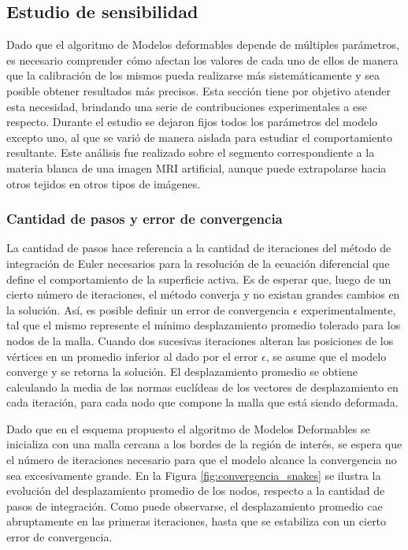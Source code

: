 \subsection{Estudio de sensibilidad}\label{section:estudio_de_sensibilidad}
Dado que el algoritmo de Modelos deformables depende de múltiples parámetros, es necesario comprender cómo afectan los valores de cada uno de ellos de manera que la calibración de los mismos pueda realizarse más sistemáticamente y sea posible obtener resultados más precisos. Esta sección tiene por objetivo atender esta necesidad, brindando una serie de contribuciones experimentales a ese respecto. Durante el estudio se dejaron fijos todos los parámetros del modelo excepto uno, al que se varió de manera aislada para estudiar el comportamiento resultante. Este análisis fue realizado sobre el segmento correspondiente a la materia blanca de una imagen MRI artificial, aunque puede extrapolarse hacia otros tejidos en otros tipos de imágenes.

\subsubsection{Cantidad de pasos y error de convergencia}
La cantidad de pasos hace referencia a la cantidad de iteraciones del método de integración de Euler necesarios para la resolución de la ecuación diferencial que define el comportamiento de la superficie activa. Es de esperar que, luego de un cierto número de iteraciones, el método converja y no existan grandes cambios en la solución. Así, es posible definir un error de convergencia $\epsilon$ experimentalmente, tal que el mismo represente el mínimo desplazamiento promedio tolerado para los nodos de la malla. Cuando dos sucesivas iteraciones alteran las posiciones de los vértices en un promedio inferior al dado por el error $\epsilon$, se asume que el modelo converge y se retorna la solución. El desplazamiento promedio se obtiene calculando la media de las normas euclídeas de los vectores de desplazamiento en cada iteración, para cada nodo que compone la malla que está siendo deformada.

Dado que en el esquema propuesto el algoritmo de Modelos Deformables se inicializa con una malla cercana a los bordes de la región de interés, se espera que el número de iteraciones necesario para que el modelo alcance la convergencia no sea excesivamente grande. En la Figura \ref{fig:convergencia_snakes} se ilustra la evolución del desplazamiento promedio de los nodos, respecto a la cantidad de pasos de integración. Como puede observarse, el desplazamiento promedio cae abruptamente en las primeras iteraciones, hasta que se estabiliza con un cierto error de convergencia.

